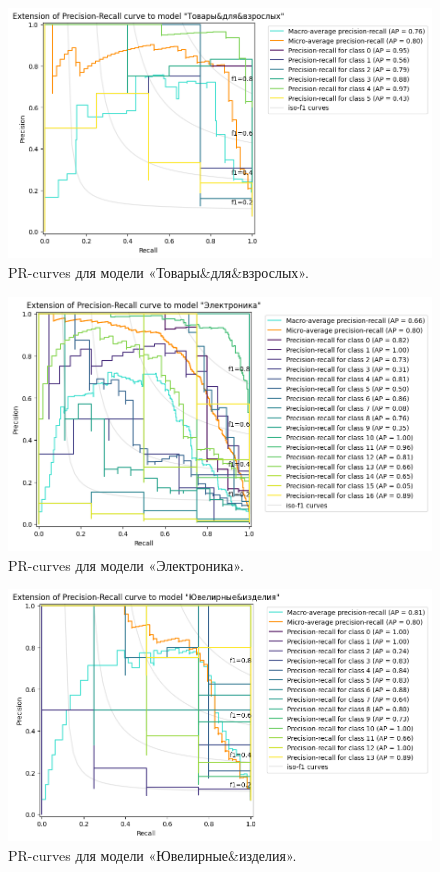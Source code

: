 \documentclass[a4paper,12pt]{extarticle}
\begin{document}
\begin{figure}[hbtp]
	\centering
	\includegraphics[scale=0.7]{pr_curves/prcurve_Товары&для&взрослых.png}
	\caption{PR-curves для модели «Товары\&для\&взрослых».}
	\label{fig:prcurve_Товары&для&взрослых}
\end{figure}

\begin{figure}[hbtp]
	\centering
	\includegraphics[scale=0.7]{pr_curves/prcurve_Электроника.png}
	\caption{PR-curves для модели «Электроника».}
	\label{fig:prcurve_Электроника}
\end{figure}

\begin{figure}[hbtp]
	\centering
	\includegraphics[scale=0.7]{pr_curves/prcurve_Ювелирные&изделия.png}
	\caption{PR-curves для модели «Ювелирные\&изделия».}
	\label{fig:prcurve_Ювелирные&изделия}
\end{figure}
\end{document}
